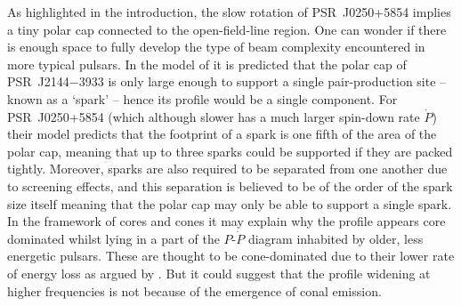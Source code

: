 As highlighted in the introduction, the slow rotation of PSR~J0250+5854 implies a tiny polar cap connected to the open-field-line region. One can wonder if there is enough space to fully develop the type of beam complexity encountered in more typical pulsars. In the model of \citet{MBMA2020} it is predicted that the polar cap of PSR~J2144$-$3933 is only large enough to support a single pair-production site -- known as a `spark' -- hence its profile would be a single component. For PSR~J0250+5854 (which although slower has a much larger spin-down rate $\dot{P}$) their model predicts that the footprint of a spark is one fifth of the area of the polar cap, meaning that up to three sparks could be supported if they are packed tightly. Moreover, sparks are also required to be separated from one another due to screening effects, and this separation is believed to be of the order of the spark size itself \citep[e.g.][]{GSxx2000} meaning that the polar cap may only be able to support a single spark. In the framework of cores and cones it may explain why the profile appears core dominated whilst lying in a part of the $P$-$\dot{P}$ diagram inhabited by older, less energetic pulsars. These are thought to be cone-dominated due to their lower rate of energy loss as argued by \citet[based on the plasma generation model of \citealt{THxx2015}]{ROWx2020}. But it could suggest that the profile widening at higher frequencies is not because of the emergence of conal emission.

